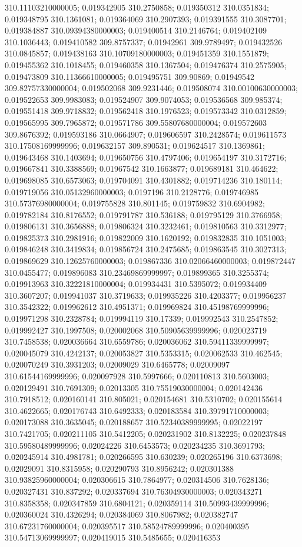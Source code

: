 310.11103210000005; 0.019342905 310.2750858; 0.019350312 310.0351834; 0.019348795 310.1361081; 0.019364069 310.2907393; 0.019391555 310.3087701; 0.019384887 310.09394380000003; 0.019400514 310.2146764; 0.019402109 310.1036443; 0.019410582 309.8757337; 0.01942961 309.9789497; 0.019432526 310.0845857; 0.019438163 310.10709180000003; 0.019451359 310.1551879; 0.019455362 310.1018455; 0.019460358 310.1367504; 0.019476374 310.2575905; 0.019473809 310.11366610000005; 0.019495751 309.90869; 0.01949542 309.82757330000004; 0.019502068 309.9231446; 0.019508074 310.00100630000003; 0.019522653 309.9983083; 0.019524907 309.9074053; 0.019536568 309.985374; 0.019551418 309.9718832; 0.019562418 310.1976523; 0.019573342 310.0312859; 0.019565995 309.7965872; 0.019571786 309.55807680000004; 0.019572603 309.8676392; 0.019593186 310.0664907; 0.019606597 310.2428574; 0.019611573 310.17508169999996; 0.019632157 309.890531; 0.019624517 310.1369861; 0.019643468 310.1403694; 0.019650756 310.4797406; 0.019654197 310.3172716; 0.019667841 310.3388569; 0.01967542 310.1663877; 0.019689181 310.464622; 0.019698085 310.6573063; 0.019704091 310.4301882; 0.019714236 310.180114; 0.019719056 310.05132960000003; 0.0197196 310.2128776; 0.019746985 310.57376980000004; 0.019755828 310.801145; 0.019759832 310.6904982; 0.019782184 310.8176552; 0.019791787 310.536188; 0.019795129 310.3766958; 0.019806131 310.3656888; 0.019806324 310.3232461; 0.019810563 310.3312977; 0.019825373 310.2981916; 0.019822009 310.1620192; 0.019832835 310.1051003; 0.019846248 310.3419834; 0.019856724 310.2475685; 0.019863545 310.3027313; 0.019869629 310.12625760000003; 0.019867336 310.02066460000003; 0.019872447 310.0455477; 0.019896083 310.23469869999997; 0.019899365 310.3255374; 0.019913963 310.32221810000004; 0.019934431 310.5395072; 0.019934409 310.3607207; 0.019941037 310.3719633; 0.019935226 310.4203377; 0.019956237 310.3542322; 0.019962612 310.4951371; 0.019969824 310.45198769999996; 0.019971298 310.2328784; 0.019994119 310.17339; 0.019992543 310.2547852; 0.019992427 310.1997508; 0.020002068 310.50905639999996; 0.020023719 310.7458538; 0.020036664 310.6559786; 0.020036062 310.59411339999997; 0.020045079 310.4242137; 0.020053827 310.5353315; 0.020062533 310.462545; 0.020070249 310.3931203; 0.02009029 310.6465778; 0.02009097 310.61544169999996; 0.020097928 310.5997666; 0.020110813 310.5603003; 0.020129491 310.7691309; 0.02013305 310.75519030000004; 0.020142436 310.7918512; 0.020160141 310.805021; 0.020154681 310.5310702; 0.020155614 310.4622665; 0.020176743 310.6492333; 0.020183584 310.39791710000003; 0.020173088 310.3635045; 0.020188657 310.52340389999995; 0.02022197 310.7421705; 0.020211105 310.5412205; 0.020231902 310.8132225; 0.020237848 310.59580489999996; 0.02024226 310.6453573; 0.020234235 310.3691793; 0.020245914 310.4981781; 0.020266595 310.630239; 0.020265196 310.6373698; 0.02029091 310.8315958; 0.020290793 310.8956242; 0.020301388 310.93825960000004; 0.020306615 310.7864977; 0.020314506 310.7628136; 0.020327431 310.837292; 0.020337694 310.76304930000003; 0.020343271 310.8358358; 0.020347859 310.6804121; 0.020359114 310.50993439999996; 0.020360024 310.4326294; 0.020384069 310.8067982; 0.020382747 310.67231760000004; 0.020395517 310.58524789999996; 0.020400395 310.54713069999997; 0.020419015 310.5485655; 0.020416353 